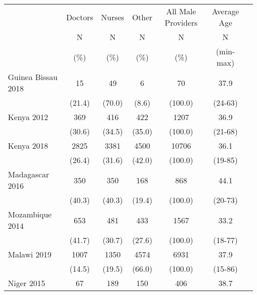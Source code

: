 \def\sym#1{\ifmmode^{#1}\else\(^{#1}\)\fi}
\begin{tabular}{l*{6}{c}}
\hline\hline
         &\multicolumn{1}{c}{Doctors}&\multicolumn{1}{c}{Nurses}&\multicolumn{1}{c}{Other}&\multicolumn{1}{c}{All Male Providers}&\multicolumn{1}{c}{Average Age}&\\
               &       N&                     N&       N&                       N&                         N\\
               &     (\%)&                 (\%)&    (\%)&                                      (\%)&                   (min-max)\\
\hline
Guinea Bissau 2018&            {15}&                {49}&           {6}&           {70}&         {37.9}\\
&                                              {(21.4)}&      {(70.0)}&             {(8.6)}&     {(100.0)}&       {(24-63)}\\
Kenya 2012&                            {369}&                {416}&           {422}&       {1207}&         {36.9}\\
&                                              {(30.6)}&      {(34.5)}&             {(35.0)}&     {(100.0)}&       {(21-68)}\\
Kenya 2018&                    {2825}&                {3381}&           {4500}&       {10706}&         {36.1}\\
&                                              {(26.4)}&      {(31.6)}&             {(42.0)}&     {(100.0)}&       {(19-85)}\\
Madagascar 2016&               {350}&                {350}&           {168}&       {868}&         {44.1}\\
&                                              {(40.3)}&      {(40.3)}&             {(19.4)}&     {(100.0)}&       {(20-73)}\\
Mozambique 2014&               {653}&                {481}&           {433}&       {1567}&         {33.2}\\
&                                              {(41.7)}&      {(30.7)}&             {(27.6)}&     {(100.0)}&       {(18-77)}\\
Malawi 2019&                   {1007}&                {1350}&           {4574}&       {6931}&         {37.9}\\
&                                              {(14.5)}&      {(19.5)}&             {(66.0)}&     {(100.0)}&       {(15-86)}\\
Niger 2015&                    {67}&                {189}&           {150}&       {406}&         {38.7}\\

\end{tabular}
